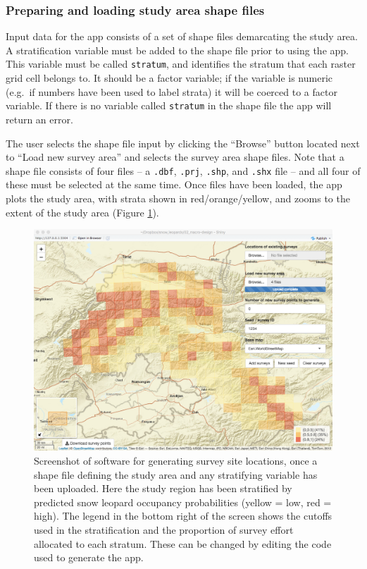 \documentclass[a4paper,11pt]{article} %
\begin{document}
\subsubsection{Preparing and loading study area shape files}
Input data for the app consists of a set of shape files demarcating the study area. A stratification variable must be added to the shape file prior to using the app. This variable must be called \texttt{stratum}, and identifies the stratum that each raster grid cell belongs to. It should be a factor variable; if the variable is numeric (e.g.\ if numbers have been used to label strata) it will be coerced to a factor variable. If there is no variable called \texttt{stratum} in the shape file the app will return an error.

The user selects the shape file input by clicking the ``Browse'' button located next to ``Load new survey area'' and selects the survey area shape files. Note that a shape file consists of four files -- a \texttt{.dbf}, \texttt{.prj}, \texttt{.shp}, and \texttt{.shx} file -- and all four of these must be selected at the same time. Once files have been loaded, the app plots the study area, with strata shown in red/orange/yellow, and zooms to the extent of the study area (Figure \ref{mac-1}). 

\begin{figure}[htbp]
\centering
\includegraphics[width=\textwidth]{mac-1}
\caption{Screenshot of software for generating survey site locations, once a shape file defining the study area and any stratifying variable has been uploaded. Here the study region has been stratified by predicted snow leopard occupancy probabilities (yellow = low, red = high). The legend in the bottom right of the screen shows the cutoffs used in the stratification and the proportion of survey effort allocated to each stratum. These can be changed by editing the code used to generate the app.}
\label{mac-1}
\end{figure}
\end{document}
